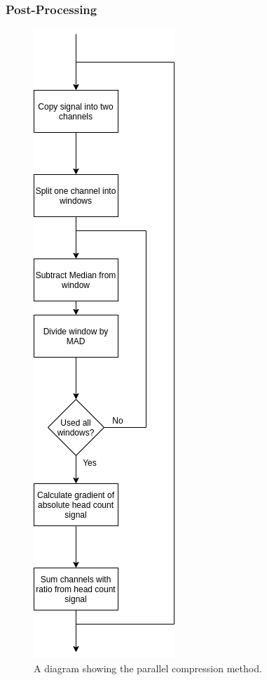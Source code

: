                 \subsubsection{Post-Processing} \label{sec:pca_data_driven_surrogate_signal_extraction_methods_for_dynamic_pet_methods_post_processing}
                    \begin{figure}
                        \centering
                        
                        \includegraphics[width=0.3\linewidth]{figures/data_driven_surrogate_signal_extraction_methods_1_parallel_compression.png}
                        
                        \captionsetup{singlelinecheck=false}
                        \caption{
                            A diagram showing the parallel compression method.
                        }
                        \label{fig:pca_data_driven_surrogate_signal_extraction_methods_for_dynamic_pet_methods_parallel_compression}
                    \end{figure}
                    
